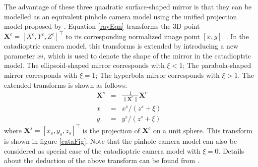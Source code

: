 \documentclass{report}
\begin{document}
\bigskip 
The advantage of these three quadratic surface-shaped mirror is that they can be modelled as an equivalent pinhole camera model using the unified projection model proposed by \cite{geyer2000unifying}. Equation \ref{rayEqn} transforms the 3D point $\mathbf{X}^c = [X^c, Y^c, Z^c]^\top$ to its corresponding normalized image point $[x, y]^\top$. In the catadioptric camera model, this transforms is extended by introducing a new parameter $xi$, which is used to denote the shape of the mirror in the catadioptric model. The ellipsoid-shaped mirror corresponds with $\xi < 1$; The parabola-shaped mirror corresponds with $\xi = 1$; The hyperbola mirror corresponds with $\xi > 1$. The extended transforms is shown as follows: 
\begin{eqnarray}
\mathbf{X}^s &=&
\frac{1}{\| \mathbf{X}^c \|} \mathbf{X}^c \\
x &=& x^s / (z^s + \xi) \label{liftEqn1}\\
y &=& y^s / (z^s + \xi) \label{liftEqn2}
\end{eqnarray}
where $\mathbf{X}^s = [x_s, y_s, z_s]^\top$ is the projection of $\mathbf{X}^c$ on a unit sphere. This transform is shown in figure \ref{cataFig}. Note that the pinhole camera model can also be considered as  special case of the catadioptric camera model with $\xi = 0$. Details about the deduction of the above transform can be found from \cite{geyer2000unifying}. 
\end{document}
